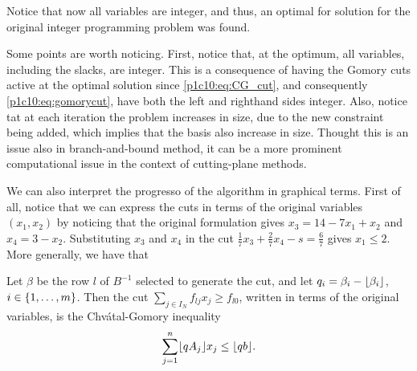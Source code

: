 Notice that now all variables are integer, and thus, an optimal for solution for the original integer programming problem was found. 

Some points are worth noticing. First, notice that, at the optimum, all variables, including the slacks, are integer. This is a consequence of having the Gomory cuts active at the optimal solution since \eqref{p1c10:eq:CG_cut}, and consequently \eqref{p1c10:eq:gomorycut}, have both the left and righthand sides integer. Also, notice tat at each iteration the problem increases in size, due to the new constraint being added, which implies that the basis also increase in size. Thought this is an issue also in branch-and-bound method, it can be a more prominent computational issue in the context of cutting-plane methods. 

We can also interpret the progresso of the algorithm in graphical terms. First of all, notice that we can express the cuts in terms of the original variables $(x_1,x_2)$ by noticing that the original formulation gives $x_3 = 14 - 7x_1 + x_2$ and $x_4 = 3-x_2$. Substituting $x_3$ and $x_4$ in the cut $\frac{1}{7}x_3 + \frac{2}{7}x_4 - s = \frac{6}{7}$ gives $x_1 \leq 2$. More generally, we have that 

\begin{proposition}
     Let $\beta$ be the row $l$ of $B^{-1}$ selected to generate the cut, and let $q_i = \beta_i - \lfloor \beta_i \rfloor$, $i \in \left\{ 1,\dots, m \right \}$. Then the cut $\sum_{j \in I_N}f_{lj}x_j \geq f_{l0}$, written in terms of the original variables, is the Chv\'atal-Gomory inequality 
 $$ \sum_{j=1}^n \lfloor qA_j \rfloor x_j \leq \lfloor qb \rfloor. $$
 \end{proposition}

